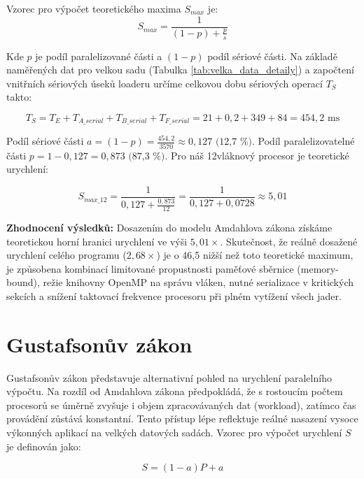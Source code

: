 \documentclass[10pt, a4paper]{report}
\begin{document}
	\noindent Vzorec pro výpočet teoretického maxima $S_{max}$ je:
	\begin{equation}
		S_{max} = \frac{1}{(1-p) + \frac{p}{s}}
	\end{equation}
	
	Kde $p$ je podíl paralelizované části a $(1-p)$ podíl sériové části. Na základě naměřených dat pro velkou sadu (Tabulka \ref{tab:velka_data_detaily}) a započtení vnitřních sériových úseků loaderu určíme celkovou dobu sériových operací $T_{S}$ takto:
	
	\begin{equation}
		T_{S} = T_E + T_{A\_serial} + T_{B\_serial} + T_{F\_serial} = 21 + 0,2 + 349 + 84 = 454,2 \text{ ms}
	\end{equation}
	
	Podíl sériové části $a = (1-p) = \frac{454,2}{3570} \approx 0,127 \text{ (12,7 \%)}$. Podíl paralelizovatelné části $p = 1 - 0,127 = 0,873 \text{ (87,3 \%)}$.  Pro náš 12vláknový procesor je teoretické urychlení:
	
	\begin{equation}
		S_{max\_12} = \frac{1}{0,127 + \frac{0,873}{12}} = \frac{1}{0,127 + 0,0728} \approx 5,01
	\end{equation}
	
	\textbf{Zhodnocení výsledků:} Dosazením do modelu Amdahlova zákona získáme teoretickou horní hranici urychlení ve výši $5,01\times$. Skutečnost, že reálně dosažené urychlení celého programu ($2,68\times$) je o 46,5 nižší než toto teoretické maximum, je způsobena kombinací limitované propustnosti paměťové sběrnice (memory-bound), režie knihovny OpenMP na správu vláken, nutné serializace v kritických sekcích a snížení taktovací frekvence procesoru při plném vytížení všech jader.
	
	\section{Gustafsonův zákon}
	
	Gustafsonův zákon představuje alternativní pohled na urychlení paralelního výpočtu. Na rozdíl od Amdahlova zákona předpokládá, že s rostoucím počtem procesorů se úměrně zvyšuje i objem zpracovávaných dat (workload), zatímco čas provádění zůstává konstantní. Tento přístup lépe reflektuje reálné nasazení vysoce výkonných aplikací na velkých datových sadách. Vzorec pro výpočet urychlení $S$ je definován jako:
	
	\begin{equation}
		S = (1 - a)P + a
	\end{equation}
	
\end{document}

